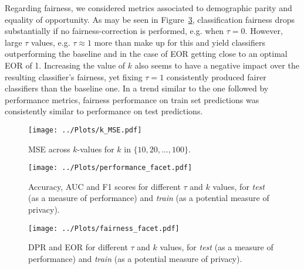 Regarding fairness, we considered metrics associated to demographic parity and equality of opportunity. As may be seen in Figure~\ref{fig:fairness}, classification fairness drops substantially if no fairness-correction is performed, e.g. when $\tau = 0$. However, large $\tau$ values, e.g. $\tau \approx 1$ more than make up for this and yield classifiers outperforming the baseline and in the case of EOR getting close to an optimal EOR of 1. Increasing the value of $k$ also seems to have a negative impact over the resulting classifier's fairness, yet fixing $\tau = 1$ consistently produced fairer classifiers than the baseline one. In a trend similar to the one followed by performance metrics, fairness performance on train set predictions was consistently similar to performance on test predictions.

\begin{figure}[h]
  \centering
  \texttt{[image: ../Plots/k\_MSE.pdf]}
  \caption{MSE across $k$-values for $k$ in $\{10, 20, \dots, 100\}$.}
  \label{fig:MSE}
\end{figure}

\begin{figure}[p]
  \centering
  \texttt{[image: ../Plots/performance\_facet.pdf]}
  \caption{Accuracy, AUC and F1 scores for different $\tau$ and $k$ values, for \emph{test} (as a measure of performance) and \emph{train} (as a potential measure of privacy).}
  \label{fig:performance}
\end{figure}

\begin{figure}[p]
  \centering
  \texttt{[image: ../Plots/fairness\_facet.pdf]}
  \caption{DPR and EOR for different $\tau$ and $k$ values, for \emph{test} (as a measure of performance) and \emph{train} (as a potential measure of privacy).}
  \label{fig:fairness}
\end{figure}
